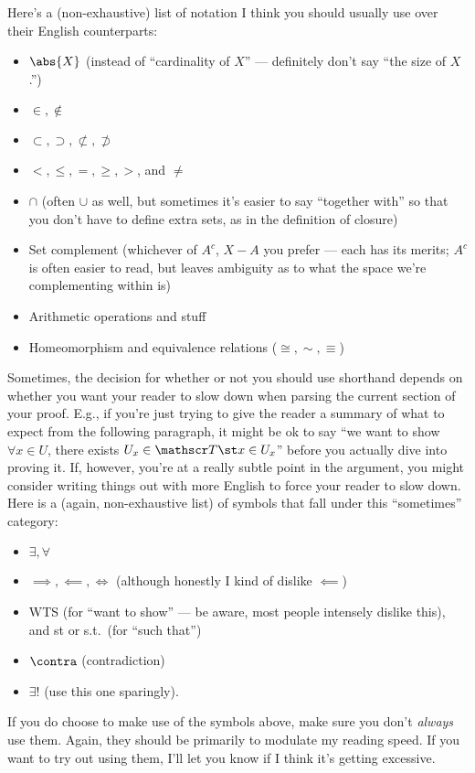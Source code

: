 \documentclass{fkpset}
\begin{document}
\begin{enumerate}[label=(\arabic*)]
    Here's a (non-exhaustive) list of notation I think you should usually use
    over their English counterparts:
    \begin{itemize}
      \item $\abs{X}$ (instead of ``cardinality of $X$'' --- definitely don't
        say ``the size of $X$.'')
      \item $\in, \not\in$
      \item $\subset, \supset, \not\subset, \not\supset$
      \item $<, \leq, =, \geq, >$, and $\neq$
      \item $\cap$ (often $\cup$ as well, but sometimes it's easier to say
        ``together with'' so that you don't have to define extra sets, as in the
        definition of closure)
      \item Set complement (whichever of $A^c$, $X-A$ you prefer --- each has
        its merits; $A^c$ is often easier to read, but leaves ambiguity as to
        what the space we're complementing within is)
      \item Arithmetic operations and stuff
      \item Homeomorphism and equivalence relations ($\cong, \sim, \equiv$)
    \end{itemize}
    Sometimes, the decision for whether or not you should use shorthand depends
    on whether you want your reader to slow down when parsing the current
    section of your proof. E.g., if you're just trying to give the reader a
    summary of what to expect from the following paragraph, it might be ok to
    say ``we want to show $\forall x \in U$, there exists $U_x \in \ms T \st x
    \in U_x$'' before you actually dive into proving it. If, however, you're at
    a really subtle point in the argument, you might consider writing things out
    with more English to force your reader to slow down. Here is a (again,
    non-exhaustive list) of symbols that fall under this ``sometimes'' category:
    \begin{itemize}
      \item $\exists, \forall$
      \item $\implies, \impliedby, \iff$ (although honestly I kind of dislike
        $\impliedby$)
      \item WTS (for ``want to show'' --- be aware, most people intensely
        dislike this), and st or s.t.\ (for ``such that'')
      \item $\contra$ (contradiction)
      \item $\exists!$ (use this one sparingly).
    \end{itemize}
    If you do choose to make use of the symbols above, make sure you don't
    \emph{always} use them. Again, they should be primarily to modulate my
    reading speed. If you want to try out using them, I'll let you know if I
    think it's getting excessive.


\end{enumerate}
\end{document}
